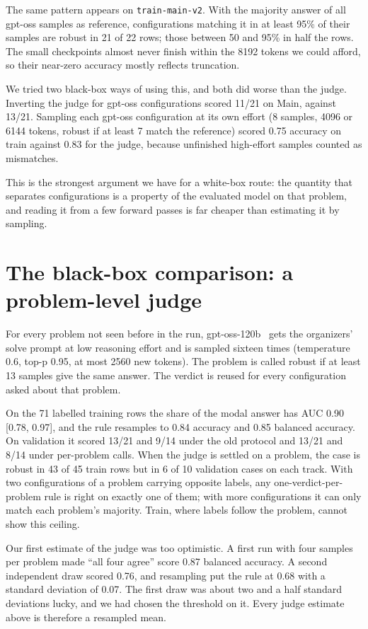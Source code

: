 \documentclass{article}
\begin{document}
The same pattern appears on \texttt{train-main-v2}. With the majority answer of all gpt-oss samples as reference, configurations matching it in at least 95\% of their samples are robust in 21 of 22 rows; those between 50 and 95\% in half the rows. The small checkpoints almost never finish within the 8192 tokens we could afford, so their near-zero accuracy mostly reflects truncation.

We tried two black-box ways of using this, and both did worse than the judge. Inverting the judge for gpt-oss configurations scored 11/21 on Main, against 13/21. Sampling each gpt-oss configuration at its own effort (8 samples, 4096 or 6144 tokens, robust if at least 7 match the reference) scored 0.75 accuracy on train against 0.83 for the judge, because unfinished high-effort samples counted as mismatches.

This is the strongest argument we have for a white-box route: the quantity that separates configurations is a property of the evaluated model on that problem, and reading it from a few forward passes is far cheaper than estimating it by sampling.

\section{The black-box comparison: a problem-level judge}\label{the-black-box-comparison-a-problem-level-judge}

For every problem not seen before in the run, gpt-oss-120b~\citep{openai2025gptoss} gets the organizers' solve prompt at low reasoning effort and is sampled sixteen times (temperature 0.6, top-p 0.95, at most 2560 new tokens). The problem is called robust if at least 13 samples give the same answer. The verdict is reused for every configuration asked about that problem.

On the 71 labelled training rows the share of the modal answer has AUC 0.90 {[}0.78, 0.97{]}, and the rule resamples to 0.84 accuracy and 0.85 balanced accuracy. On validation it scored 13/21 and 9/14 under the old protocol and 13/21 and 8/14 under per-problem calls. When the judge is settled on a problem, the case is robust in 43 of 45 train rows but in 6 of 10 validation cases on each track. With two configurations of a problem carrying opposite labels, any one-verdict-per-problem rule is right on exactly one of them; with more configurations it can only match each problem's majority. Train, where labels follow the problem, cannot show this ceiling.

Our first estimate of the judge was too optimistic. A first run with four samples per problem made ``all four agree'' score 0.87 balanced accuracy. A second independent draw scored 0.76, and resampling put the rule at 0.68 with a standard deviation of 0.07. The first draw was about two and a half standard deviations lucky, and we had chosen the threshold on it. Every judge estimate above is therefore a resampled mean.
\end{document}
